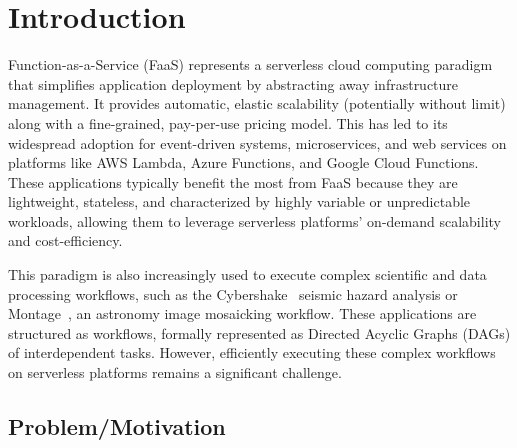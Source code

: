 \chapter{Introduction}
\label{chap:intro}
\chaptoc
\bigskip

Function-as-a-Service (FaaS) represents a serverless cloud computing paradigm that simplifies application deployment by abstracting away infrastructure management. It provides automatic, elastic scalability (potentially without limit) along with a fine-grained, pay-per-use pricing model. This has led to its widespread adoption for event-driven systems, microservices, and web services on platforms like AWS Lambda\cite{aws_lambda}, Azure Functions\cite{azure_functions}, and Google Cloud Functions\cite{google_cloud_run_functions}. These applications typically benefit the most from FaaS because they are lightweight, stateless, and characterized by highly variable or unpredictable workloads, allowing them to leverage serverless platforms' on-demand scalability and cost-efficiency.

This paradigm is also increasingly used to execute complex scientific and data processing workflows, such as the Cybershake~\cite{cybershake_workflow} seismic hazard analysis or Montage~\cite{montage_astronomy}, an astronomy image mosaicking workflow. These applications are structured as workflows, formally represented as Directed Acyclic Graphs (DAGs) of interdependent tasks. However, efficiently executing these complex workflows on serverless platforms remains a significant challenge. 

\section{Problem/Motivation}

